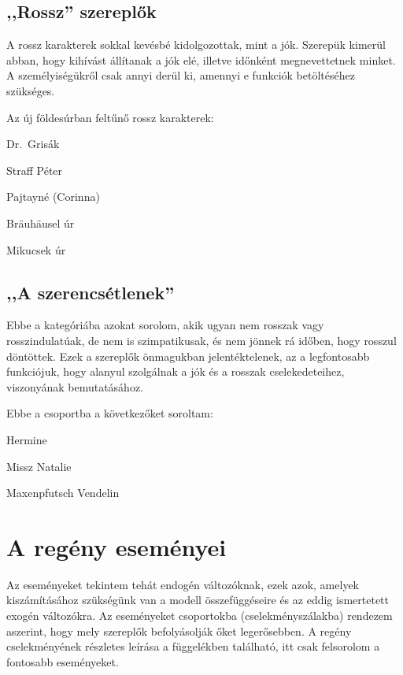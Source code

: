 \documentclass{thesis-ekf}
\begin{document}
    \subsection{,,Rossz'' szereplők}

    A rossz karakterek sokkal kevésbé kidolgozottak, mint a jók.
    Szerepük kimerül abban, hogy kihívást állítanak a jók elé, illetve időnként megnevettetnek minket.
    A személyiségükről csak annyi derül ki, amennyi e funkciók betöltéséhez szükséges.

    Az új földesúrban feltűnő rossz karakterek:

    \begin{compactitem}
        \item Dr.~Grisák
        \item Straff Péter
        \item Pajtayné (Corinna)
        \item Bräuhäusel úr
        \item Mikucsek úr
    \end{compactitem}

    \subsection{,,A szerencsétlenek''}

    Ebbe a kategóriába azokat sorolom, akik ugyan nem rosszak vagy rosszindulatúak, de nem is szimpatikusak,
        és nem jönnek rá időben, hogy rosszul döntöttek.
    Ezek a szereplők önmagukban jelentéktelenek, az a legfontosabb funkciójuk, hogy alanyul szolgálnak
        a jók és a rosszak cselekedeteihez, viszonyának bemutatásához.

    Ebbe a csoportba a következőket soroltam:

    \begin{compactitem}
        \item Hermine
        \item Missz Natalie
        \item Maxenpfutsch Vendelin
    \end{compactitem}


    \section{A regény eseményei}\label{sec:a-regeny-esemenyei}

    Az eseményeket tekintem tehát endogén változóknak, ezek azok, amelyek kiszámításához szükségünk van
        a modell összefüggéseire és az eddig ismertetett exogén változókra.
    Az eseményeket csoportokba (cselekményszálakba) rendezem aszerint, hogy mely szereplők befolyásolják őket legerősebben.
    A regény cselekményének részletes leírása a függelékben található, itt csak felsorolom a fontosabb eseményeket.
\end{document}
